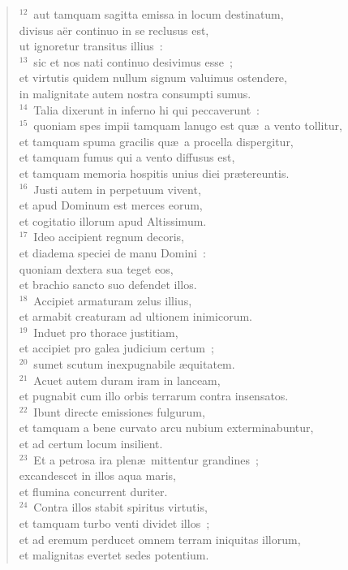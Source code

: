 \begin{flushleft}
\begin{verse}
${}^{12}$~aut tamquam sagitta emissa in locum destinatum,\\ divisus a\"er continuo in se reclusus est,\\ ut ignoretur transitus illius~:\\
${}^{13}$~sic et nos nati continuo desivimus esse~;\\ et virtutis quidem nullum signum valuimus ostendere,\\ in malignitate autem nostra consumpti sumus.\\
${}^{14}$~Talia dixerunt in inferno hi qui peccaverunt~:\\
${}^{15}$~quoniam spes impii tamquam lanugo est qu\ae\ a vento tollitur,\\ et tamquam spuma gracilis qu\ae\ a procella dispergitur,\\ et tamquam fumus qui a vento diffusus est,\\ et tamquam memoria hospitis unius diei pr\ae tereuntis.\\
${}^{16}$~Justi autem in perpetuum vivent,\\ et apud Dominum est merces eorum,\\ et cogitatio illorum apud Altissimum.\\
${}^{17}$~Ideo accipient regnum decoris,\\ et diadema speciei de manu Domini~:\\ quoniam dextera sua teget eos,\\ et brachio sancto suo defendet illos.\\
${}^{18}$~Accipiet armaturam zelus illius,\\ et armabit creaturam ad ultionem inimicorum.\\
${}^{19}$~Induet pro thorace justitiam,\\ et accipiet pro galea judicium certum~;\\
${}^{20}$~sumet scutum inexpugnabile \ae quitatem.\\
${}^{21}$~Acuet autem duram iram in lanceam,\\ et pugnabit cum illo orbis terrarum contra insensatos.\\
${}^{22}$~Ibunt directe emissiones fulgurum,\\ et tamquam a bene curvato arcu nubium exterminabuntur,\\ et ad certum locum insilient.\\
${}^{23}$~Et a petrosa ira plen\ae\ mittentur grandines~;\\ excandescet in illos aqua maris,\\ et flumina concurrent duriter.\\
${}^{24}$~Contra illos stabit spiritus virtutis,\\ et tamquam turbo venti dividet illos~;\\ et ad eremum perducet omnem terram iniquitas illorum,\\ et malignitas evertet sedes potentium.\end{verse}\end{flushleft}


